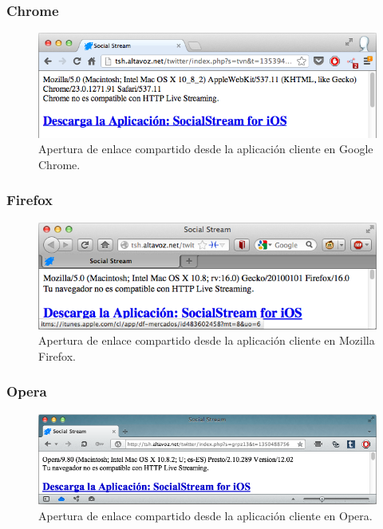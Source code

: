     \subsubsection{Chrome}
  \begin{figure}[H]
	\centering
	\includegraphics[scale=0.6]{imgs/uagent-chrome.png} 
	\caption{Apertura de enlace compartido desde la aplicación cliente en Google Chrome.}
	\label{fig:uagent-chrome}
\end{figure}  
    \subsubsection{Firefox}
  \begin{figure}[H]
	\centering
	\includegraphics[scale=0.6]{imgs/uagent-firefox.png} 
	\caption{Apertura de enlace compartido desde la aplicación cliente en Mozilla Firefox.}
	\label{fig:uagent-firefox}
\end{figure}  
    \subsubsection{Opera}
  \begin{figure}[H]
	\centering
	\includegraphics[scale=0.55]{imgs/uagent-opera.png} 
	\caption{Apertura de enlace compartido desde la aplicación cliente en Opera.}
	\label{fig:uagent-opera}
\end{figure}  
